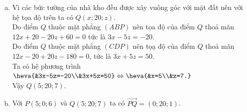 \begin{bt}
{\begin{enumerate}[a)]
\begin{itemize}
				\[\left[\overrightarrow{AB},\overrightarrow{AP}\right]=\left(\begin{vmatrix}
					20 & 1\\
					0 & -3
				\end{vmatrix};
				\begin{vmatrix}
					1 & 0\\
					-3 & -5
				\end{vmatrix};
				\begin{vmatrix}
					0 & 20\\
					-5 & 0
				\end{vmatrix}
				\right)=\left(-60;-5;100\right)\]	
				Mà mặt phẳng $(ABP)$ đi qua điểm $A(10;0;9)$ nên có phương trình là
				$$-60(x-10)-5(y-0)+100(z-9)=0 \Leftrightarrow 12x+y-20z+60=0.$$
				\item Do mặt phẳng $(CDP)$ có cặp véc-tơ chỉ phương là $\overrightarrow{DP}=(5;0;-3)$, $\overrightarrow{DC}=(0;20;1)$ nên có một véc-tơ pháp tuyến là
				$$[\overrightarrow{DP},\overrightarrow{DC}]=\left(\left|\begin{array}{cc}
					0 & -3\\
					20 & 1
				\end{array}\right|;\left|\begin{array}{cc}
					-3 & 5\\
					1 & 0
				\end{array}\right|;\left|\begin{array}{cc}
					5 & 0\\
					0 & 20
				\end{array}\right|\right)=(60;-5;100).$$
				Mà mặt phẳng $(CDP)$ đi qua điểm $D(0;0;9)$ nên có phương trình là
				$$60(x-0)-5(y-0)+100(z-9)=0 \Leftrightarrow 12x-y+20z-180=0.$$
			\end{itemize}
			\item Vì các bức tường của nhà kho đều được xây vuông góc với mặt đất nên với hệ tọa độ trên ta có $Q(x;20;z)$.\\
			Do điểm $Q$ thuộc mặt phẳng $(ABP)$ nên tọa độ của điểm $Q$ thoả mãn $12x+20-20z+60=0$ tức là $3x-5z=-20$.\\
			Do điểm $Q$ thuộc mặt phẳng $(CDP)$ nên tọạ độ của điểm $Q$ thoả mãn $12x-20+20z-180=0$, tức là $3x+5z=50$.\\
			Ta có hệ phương trình $\heva{&3x-5z=-20\\&3x+5z=50} \Leftrightarrow \heva{&x=5\\&z=7.}$\\
			Vậy $Q(5;20;7)$.
			\item Với $P(5;0;6)$ và $Q(5;20;7)$ ta có $\overrightarrow{PQ}=(0;20;1)$.
		\end{enumerate}
	}
\end{bt}

